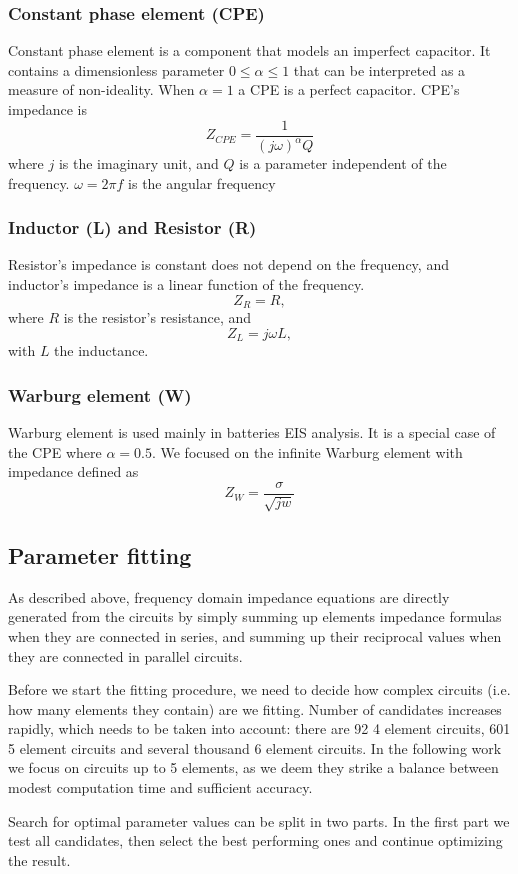 \documentclass[
    11pt,
    a4paper,
    oneside
]{article}
\begin{document}
\subsubsection*{Constant phase element (CPE)}
Constant phase element is a component that models an imperfect capacitor. It contains a dimensionless parameter $0\le\alpha\leq1$ that can be
interpreted as a measure of non-ideality. When $\alpha=1$ a CPE is a perfect capacitor.
CPE's impedance is
\[
    Z_{CPE} = \frac{1}{(j\omega)^{\alpha}Q}
\]
where $j$ is the imaginary unit, and $Q$ is a parameter independent of the frequency. $\omega=2\pi f$ is the angular frequency
\subsubsection*{Inductor (L) and Resistor (R)}

Resistor's impedance is constant does not depend on the frequency, and inductor's impedance is a linear function of the frequency. 
$$Z_R = R,$$
where $R$ is the resistor's resistance, and
\[
    Z_L = j\omega L,
\]
with $L$ the inductance.
\subsubsection*{Warburg element (W)}
Warburg element is used mainly in batteries EIS analysis. It is a special case of the CPE where $\alpha=0.5$. We focused on the infinite Warburg
element with impedance defined as
\[
    Z_W = \frac{\sigma}{\sqrt{jw}}
\]
\subsection{Parameter fitting}
As described above, frequency domain impedance equations are directly generated from the circuits by simply summing up elements
impedance formulas when they are connected in series, and summing up their reciprocal values when they are connected in parallel circuits.

Before we start the fitting procedure, we need to decide how complex circuits (i.e. how many elements they contain) are we fitting. Number of
candidates increases rapidly, which needs to be taken into account: there are 92 4 element circuits, 601 5 element circuits and several thousand 6 element
circuits. In the following work we focus on circuits up to 5 elements, as we deem they strike a balance between modest computation time and sufficient
accuracy.

Search for optimal parameter values can be split in two parts. In the first part we test all candidates, then select the best performing ones and 
continue optimizing the result.
\end{document}
